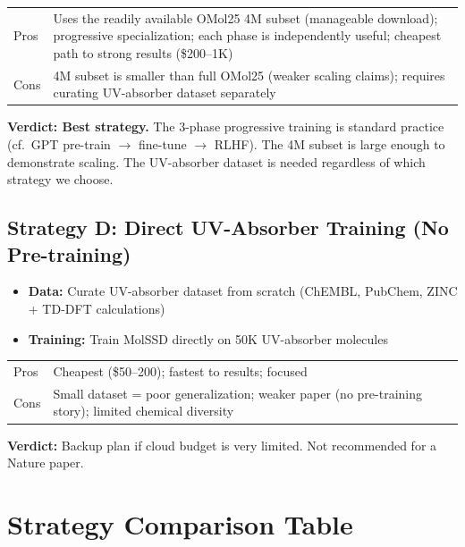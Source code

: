 \documentclass[11pt,a4paper]{article}
\begin{document}
\begin{tabular}{@{}lp{10cm}@{}}
\toprule
\textcolor{best}{Pros} & Uses the readily available OMol25 4M subset (manageable
download); progressive specialization; each phase is independently useful;
cheapest path to strong results (\$200--1K) \\
\textcolor{warn}{Cons} & 4M subset is smaller than full OMol25 (weaker scaling
claims); requires curating UV-absorber dataset separately \\
\bottomrule
\end{tabular}

\medskip
\textbf{Verdict: \textcolor{best}{Best strategy.}} The 3-phase progressive
training is standard practice (cf.\ GPT pre-train $\to$ fine-tune $\to$ RLHF).
The 4M subset is large enough to demonstrate scaling. The UV-absorber dataset
is needed regardless of which strategy we choose.

\subsection{Strategy D: Direct UV-Absorber Training (No Pre-training)}

\begin{itemize}[nosep]
    \item \textbf{Data:} Curate UV-absorber dataset from scratch (ChEMBL, PubChem,
          ZINC + TD-DFT calculations)
    \item \textbf{Training:} Train MolSSD directly on 50K UV-absorber molecules
\end{itemize}

\begin{tabular}{@{}lp{10cm}@{}}
\toprule
\textcolor{best}{Pros} & Cheapest (\$50--200); fastest to results; focused \\
\textcolor{bad}{Cons} & Small dataset = poor generalization; weaker paper
(no pre-training story); limited chemical diversity \\
\bottomrule
\end{tabular}

\medskip
\textbf{Verdict:} Backup plan if cloud budget is very limited. Not recommended
for a Nature paper.

\section{Strategy Comparison Table}
\end{document}
